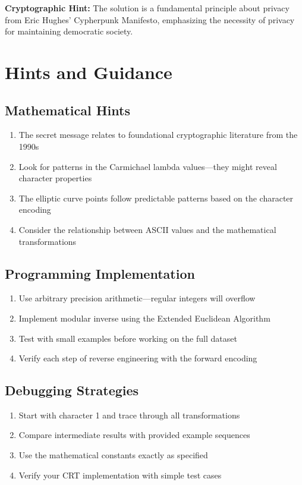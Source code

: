 \documentclass[11pt,a4paper]{article}
\begin{document}
\textbf{Cryptographic Hint:} The solution is a fundamental principle about privacy from Eric Hughes' Cypherpunk Manifesto, emphasizing the necessity of privacy for maintaining democratic society.

\section{Hints and Guidance}

\subsection{Mathematical Hints}

\begin{enumerate}
    \item The secret message relates to foundational cryptographic literature from the 1990s
    \item Look for patterns in the Carmichael lambda values—they might reveal character properties
    \item The elliptic curve points follow predictable patterns based on the character encoding
    \item Consider the relationship between ASCII values and the mathematical transformations
\end{enumerate}

\subsection{Programming Implementation}

\begin{enumerate}
    \item Use arbitrary precision arithmetic—regular integers will overflow
    \item Implement modular inverse using the Extended Euclidean Algorithm
    \item Test with small examples before working on the full dataset
    \item Verify each step of reverse engineering with the forward encoding
\end{enumerate}

\subsection{Debugging Strategies}

\begin{enumerate}
    \item Start with character 1 and trace through all transformations
    \item Compare intermediate results with provided example sequences
    \item Use the mathematical constants exactly as specified
    \item Verify your CRT implementation with simple test cases
\end{enumerate}
\end{document}
